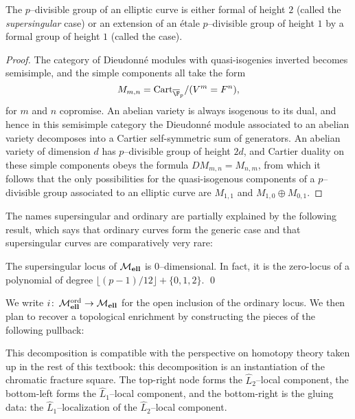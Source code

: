\begin{lemma}
The $p$--divisible group of an elliptic curve is either formal of height $2$ (called the \textit{supersingular} case) or an extension of an \'etale $p$--divisible group of height $1$ by a formal group of height $1$ (called the  case).
\end{lemma}
\begin{proof}
The category of Dieudonn\'e modules with quasi-isogenies inverted becomes semisimple, and the simple components all take the form \[M_{m, n} = \Cart_{\overline{\F}_p} / (V^m = F^n),\] for $m$ and $n$ copromise.  An abelian variety is always isogenous to its dual, and hence in this semisimple category the Dieudonn\'e module associated to an abelian variety decomposes into a Cartier self-symmetric sum of generators.  An abelian variety of dimension $d$ has $p$--divisible group of height $2d$, and Cartier duality on these simple components obeys the formula $DM_{m,n} = M_{n,m}$, from which it follows that the only possibilities for the quasi-isogenous components of a $p$--divisible group associated to an elliptic curve are $M_{1,1}$ and $M_{1,0} \oplus M_{0,1}$.
\end{proof}

The names supersingular and ordinary are partially explained by the following result, which says that ordinary curves form the generic case and that supersingular curves are comparatively very rare:

\begin{lemma}
The supersingular locus of $\mathcal{M}_{\mathbf{ell}}$ is $0$--dimensional.  In fact, it is the zero-locus of a polynomial of degree $\lfloor (p-1)/12 \rfloor + \{0, 1, 2\}$. \qed
\end{lemma}

\noindent We write $i\colon\thinspace \mathcal{M}_{\mathbf{ell}}^{\mathrm{ord}} \to \mathcal{M}_{\mathbf{ell}}$ for the open inclusion of the ordinary locus.  We then plan to recover a topological enrichment by constructing the pieces of the following pullback:
\begin{center}
\end{center}
This decomposition is compatible with the perspective on homotopy theory taken up in the rest of this textbook: this decomposition is an instantiation of the chromatic fracture square.  The top-right node forms the $\widehat L_2$--local component, the bottom-left forms the $\widehat L_1$--local component, and the bottom-right is the gluing data: the $\widehat L_1$--localization of the $\widehat L_2$--local component.






